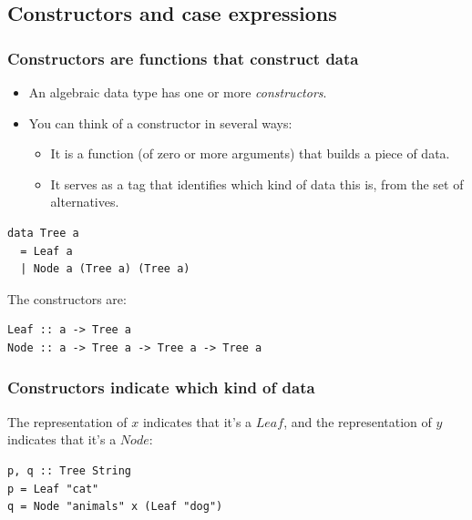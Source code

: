 \documentclass{beamer}
\begin{document}
\subsection{Constructors and case expressions}

\begin{frame}[fragile]
\frametitle{Constructors are functions that construct data}

\begin{itemize}
\item An algebraic data type has one or more \emph{constructors}.
\item You can think of a constructor in several ways:
  \begin{itemize}
  \item It is a function (of zero or more arguments) that builds a
    piece of data.
  \item It serves as a tag that identifies which kind of data this
    is, from the set of alternatives.
  \end{itemize}
\end{itemize}

\begin{verbatim}
data Tree a
  = Leaf a
  | Node a (Tree a) (Tree a)
\end{verbatim}

The constructors are:

\begin{verbatim}
Leaf :: a -> Tree a
Node :: a -> Tree a -> Tree a -> Tree a
\end{verbatim}

\end{frame}

\begin{frame}[fragile]
\frametitle{Constructors indicate which kind of data}

The representation of $x$ indicates that it's a $Leaf$, and the
representation of $y$ indicates that it's a $Node$:

\begin{verbatim}
p, q :: Tree String
p = Leaf "cat"
q = Node "animals" x (Leaf "dog")
\end{verbatim}

\end{frame}
\end{document}
